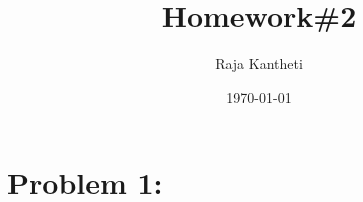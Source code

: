 \documentclass[11pt]{article}
\title{Homework\#2}
\author{Raja Kantheti}
\date{\today}
\begin{document}
\maketitle
\section*{Problem 1:}
\end{document}
